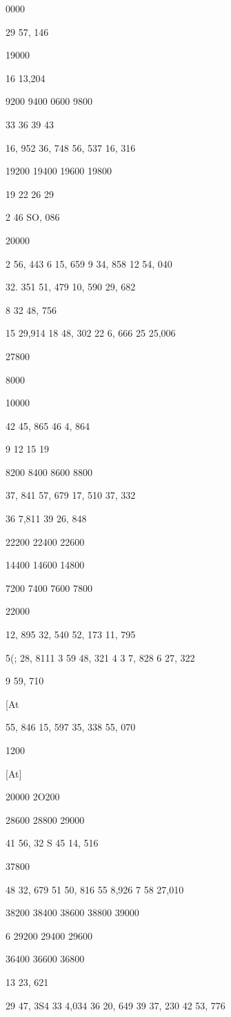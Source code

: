 \documentclass[10pt,a4paper]{article}
\begin{document}
0000

29 57, 146

19000

16 13,204

9200
9400
0600
9800

33
36
39
43

16, 952
36, 748
56, 537
16, 316

19200
19400
19600
19800

19
22
26
29

2 46 SO, 086

20000

2 56, 443
6 15, 659
9 34, 858
12 54, 040

32. 351
51, 479
10, 590
29, 682

8 32 48, 756

15 29,914
18 48, 302
22
6, 666
25 25,006

27800

8000

10000

42 45, 865
46
4, 864

9
12
15
19

8200
8400
8600
8800

37, 841
57, 679
17, 510
37, 332

36
7,811
39 26, 848

22200
22400
22600

14400
14600
14800

7200
7400
7600
7800

22000

12, 895
32, 540
52, 173
11, 795

5(; 28, 8111
3 59 48, 321
4 3 7, 828
6 27, 322

9 59, 710

[At

55, 846
15, 597
35, 338
55, 070

1200

[At]

20000
2O200

28600
28800
29000

41 56, 32 S
45 14, 516

37800

48 32, 679
51 50, 816
55
8,926
7 58 27,010

38200
38400
38600
38800
39000

6
29200
29400
29600

36400
36600
36800

13 23, 621

29 47, 3S4
33
4,034
36 20, 649
39 37, 230
42 53, 776
\end{document}
